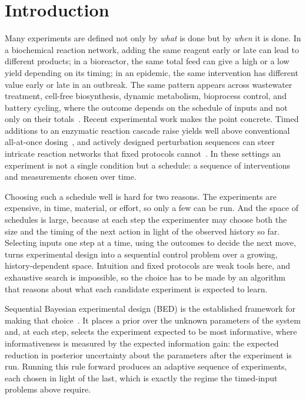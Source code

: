\chapter{Introduction}
\label{sec:introduction}

Many experiments are defined not only by \emph{what} is done but by \emph{when} it is
done. In a biochemical reaction network, adding the same reagent early or late can lead
to different products; in a bioreactor, the same total feed can give a high or a low
yield depending on its timing; in an epidemic, the same intervention has different value
early or late in an outbreak. The same pattern appears across wastewater treatment,
cell-free biosynthesis, dynamic metabolism, bioprocess control, and battery
cycling, where the outcome depends on the schedule of inputs and not only on their
totals~\citep{henze2000activated,silverman2020cellfree,martin2023dynamic,espinelrios2024cybergenetics,vanvlijmen2025battery}.
Recent experimental work makes the point concrete. Timed additions to an enzymatic
reaction cascade raise yields well above conventional all-at-once
dosing~\citep{jakstaite2026timedbatch}, and actively designed perturbation sequences can
steer intricate reaction networks that fixed protocols cannot~\citep{vansluijs2024iterative}.
In these settings an experiment is not a single condition but a schedule: a sequence of
interventions and measurements chosen over time.

Choosing such a schedule well is hard for two reasons. The experiments are expensive, in
time, material, or effort, so only a few can be run. And the space of schedules is large,
because at each step the experimenter may choose both the size and the timing of the next
action in light of the observed history so far. Selecting inputs one step at a time, using the
outcomes to decide the next move, turns experimental design into a sequential
control problem over a growing, history-dependent space. Intuition and fixed protocols
are weak tools here, and exhaustive search is impossible, so the choice has to be made by
an algorithm that reasons about what each candidate experiment is expected to learn.

Sequential Bayesian experimental design (BED) is the established framework for making
that choice~\citep{lindley1956measure,chaloner1995bayesian,ryan2016review,rainforth2024modern}.
It places a prior over the unknown parameters of the system and, at each step, selects
the experiment expected to be most informative, where informativeness is measured by the
expected information gain: the expected reduction in posterior uncertainty about the
parameters after the experiment is run. Running this rule forward produces an adaptive
sequence of experiments, each chosen in light of the last, which is exactly the regime
the timed-input problems above require.


